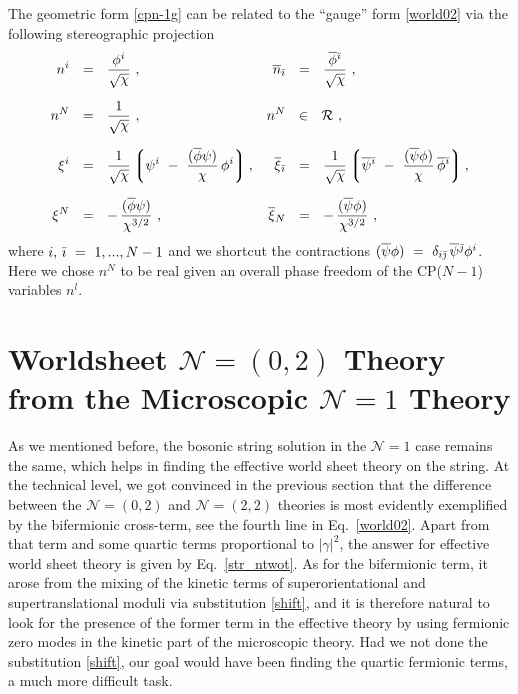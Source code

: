 \documentclass[12pt]{article}
\newcommand{\ntwot}{${\mathcal N}= \left(2,2\right) $ }
\newcommand{\ntwoo}{${\mathcal N}= \left(0,2\right) $ }
\newcommand{\none}{${\mathcal N}=1$ }
\newcommand{\ov}{\overline}
\newcommand{\mc}[1]{\mathcal{#1}}
\newcommand{\lgr}{\left\lgroup}
\newcommand{\rgr}{\right\rgroup}
\begin{document}
	The geometric form \eqref{cpn-1g} can be related to the ``gauge'' form \eqref{world02}
	via the following stereographic projection
\begin{align*}
%
	n^i & ~~=~~ \frac{\phi^i}{\sqrt{\chi}}~,
	& 
	\ov{n}_\bi & ~~=~~ \frac{\ov{\phi}{}^\bi}{\sqrt{\chi}}~,
\\[2mm]
%
	n^N & ~~=~~ \frac{1}{\sqrt{\chi}}~,
	& n^N & ~~\in~~ \mc{R}~,
\\[2mm]
%
	\xi^i & ~~=~~ \frac{1}{\sqrt{\chi}} \lgr \psi^i ~-~ \frac{(\ov{\phi}\psi)}{\chi}\,\phi^i \rgr,
	& 
	\ov{\xi}{}_\bi & ~~=~~ \frac{1}{\sqrt{\chi}} 
					\lgr \ov{\psi}{}^\bi ~-~ \frac{(\ov{\psi}\phi)}{\chi}\, \ov{\phi}{}^\bi \rgr,
\\[2mm]
%
	\xi^N & ~~=~~ -\, \frac{(\ov{\phi} \psi)}{\chi^{3/2}}~,
	&
	\ov{\xi}{}_N & ~~=~~ -\, \frac{(\ov{\psi} \phi)}{\chi^{3/2}}~,
\end{align*}
	where $	i,\, {\bar \imath} ~=~ 1, ..., N-1 $ and we shortcut the contractions 
	$ (\ov{\psi} \phi) ~=~ \delta_{i\bj}\, \ov{\psi}{}^\bj \phi^i $.
	Here we chose $ n^N $ to be real given an overall phase freedom of the CP($N-1$) variables $ n^l $.


%
%
\section{Worldsheet \boldmath\ntwoo Theory from the Microscopic \boldmath\none Theory}
\label{WS}
\setcounter{equation}{0}

	As we mentioned before, the bosonic string solution in the \none case remains the same,
	which helps in finding the effective world sheet theory on the string. 
	At the technical level, we got convinced in the previous section that the difference
	between the \ntwoo and \ntwot theories is most evidently exemplified by the bifermionic cross-term,
	see the fourth line in Eq.~\eqref{world02}.
	Apart from that term and some quartic terms proportional to $|\gamma|^2$, the answer for effective 
	world sheet theory is given by Eq.~\eqref{str_ntwot}.
	As for the bifermionic term, it arose from the mixing of the kinetic terms of 
	superorientational and supertranslational moduli via substitution \eqref{shift}, and it is therefore 
	natural to look for the presence of the former term in the effective theory by using fermionic zero modes 
	in the kinetic part of the microscopic theory. 
	Had we not done the substitution \eqref{shift}, our goal would have been finding the quartic fermionic terms,
	a much more difficult task. 
\end{document}
